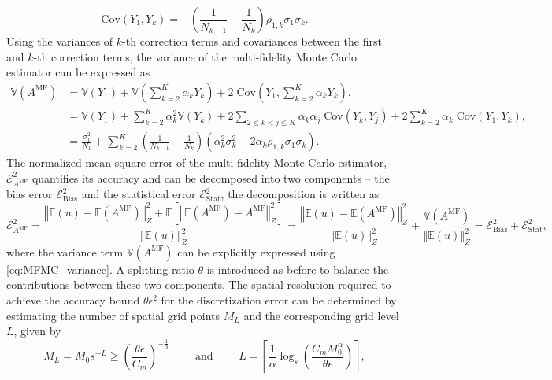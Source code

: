 %
\[
\text{Cov}(Y_1,Y_k) = - \left(\frac{1}{N_{k-1}} - \frac{1}{N_k}\right)\rho_{1,k}\sigma_1\sigma_k.
\]
%
Using the variances of $k$-th correction terms and covariances between the first and $k$-th correction terms, the variance of the multi-fidelity Monte Carlo estimator can be expressed as
%
\begin{align}
    \nonumber
    \mathbb{V}\left(A^{\text{MF}}\right) &= \mathbb{V}\left(Y_1\right) + \mathbb{V}\left(\sum_{k=2}^K \alpha_kY_k\right)+2\;\text{Cov}\left(Y_1,\sum_{k=2}^K \alpha_k Y_k \right),\\
    \nonumber
    &=\mathbb{V}\left(Y_1\right) + \sum_{k=2}^K \alpha_k^2 \mathbb{V}\left(Y_k\right)+2\sum_{2\le k<j\le K} \alpha_k\alpha_j\; \text{Cov}(Y_k,Y_j) +2\sum_{k=2}^K \alpha_k\;\text{Cov}\left(Y_1, Y_k\right),\\
    \label{eq:MFMC_variance}
    &=\frac{\sigma_1^2}{N_1} + \sum_{k=2}^K \left(\frac{1}{N_{k-1}} - \frac{1}{N_k}\right)\left(\alpha_k^2\sigma_k^2 - 2\alpha_k\rho_{1,k}\sigma_1\sigma_k\right).
\end{align}
%
The normalized mean square error of the multi-fidelity Monte Carlo estimator, $\mathcal{E}_{A^{\text{MF}}}^2$ quantifies its accuracy and can be decomposed into two components -- the bias error $\mathcal{E}_{\text{Bias}}^2$ and the statistical error $\mathcal{E}_{\text{Stat}}^2$, the decomposition is written as 
%
\[
\mathcal{E}_{A^{\text{MF}}}^2= \frac{\left\Vert\mathbb{E}(u)-\mathbb{E}(A^{\text{MF}}) \right\Vert_{Z}^2+\mathbb E\left[\left\Vert\mathbb{E}(A^{\text{MF}})-A^{\text{MF}} \right\Vert_{Z}^2\right]}{\left\Vert\mathbb{E}(u) \right\Vert_{Z}^2} =\frac{\left\Vert\mathbb{E}(u)-\mathbb{E}(A^{\text{MF}}) \right\Vert_{Z}^2}{\left\Vert\mathbb{E}(u) \right\Vert_{Z}^2}+ \frac{\mathbb{V}\left(A^{\text{MF}}\right)}{\left\Vert\mathbb{E}(u) \right\Vert_{Z}^2}=\mathcal{E}_{\text{Bias}}^2 + \mathcal{E}_{\text{Stat}}^2,
\]
%
where the variance term $\mathbb{V}\left(A^{\text{MF}}\right)$  can be explicitly expressed using \eqref{eq:MFMC_variance}. A splitting ratio $\theta$ is introduced as before to balance the contributions between these two components. The spatial resolution required to achieve the accuracy bound $\theta \epsilon^2$ for the discretization error can be determined by estimating the number of spatial grid points $M_L$ and the corresponding grid level $L$, given by
%
\begin{equation}
    \label{eq:SLSGC_MLS_SpatialGridsNo}
    M_L = M_0s^{-L} \ge \left(\frac{\theta\epsilon}{C_m}\right)^{-\frac 1 {\alpha}} \qquad \text{ and } \qquad     L = \left\lceil \frac{1}{\alpha}\log_s \left(\frac{C_m M_0^\alpha}{\theta\epsilon}\right) \right\rceil,
\end{equation}
